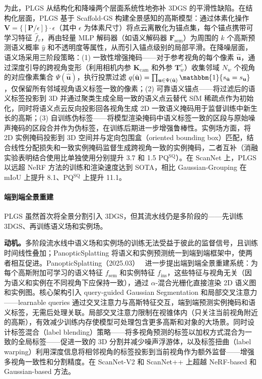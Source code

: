 为此，PLGS 从结构化和降噪两个层面系统性地弥补 3DGS 的平滑性缺陷。在结构化层面，PLGS 基于 Scaffold-GS 构建全景感知的高斯模型：通过体素化操作 $\mathbf{V} = \{[\mathbf{P}/\epsilon]\} \cdot \epsilon$（其中 $\epsilon$ 为体素尺寸）将点云离散化为锚点集，每个锚点携带可学习特征 $\hat{f}_v$，再由轻量 MLP 解码器（如语义解码器 $\mathbf{F}_{\text{sem}}$）为周围的 $k$ 个高斯预测语义概率 $\hat{y}$ 和不透明度等属性，从而引入锚点级别的局部平滑。在降噪层面，语义场采用三阶段策略：(1) 一致性增强掩码——对于参考视角的每个像素 $\hat{\mathbf{u}}$，通过深度引导的跨视角变形（利用相机内参 $\mathbf{K}_{\text{cam}}$ 和外参 $\mathbf{T}_w^c$）收集邻域 $N_w$ 个视角的对应像素集合 $\Psi(\hat{\mathbf{u}})$，执行投票过滤 $q(\hat{\mathbf{u}}) = \prod_{\mathbf{u} \in \Psi(\hat{\mathbf{u}})} \mathbbm{1}\{s_{\hat{\mathbf{u}}} = s_{\mathbf{u}}\}$，仅保留所有邻域视角语义标签一致的像素；(2) 可靠语义锚点——将过滤后的语义标签投影到 3D 并通过聚类生成全局一致的语义点云替代 SfM 稀疏点作为初始化，同时将语义点云反向投影回各视角生成 2D 一致语义掩码用于监督训练中新生长的高斯；(3) 自训练伪标签——将模型渲染掩码中语义标签一致的区段与原始噪声掩码的区段合并作为伪标签，在训练后期进一步增强鲁棒性。实例场方面，将 2D 实例掩码投影到 3D 空间并与定向包围盒（oriented bounding box）匹配，结合线性分配损失和一致实例掩码监督生成跨视角一致的实例掩码，二者互补（消融实验表明结合使用比单独使用分别提升 3.7 和 1.5 PQ$^{\text{SQ}}$）。在 ScanNet 上，PLGS 以远超 NeRF 方法的训练和渲染速度达到 SOTA，相比 Gaussian-Grouping 在 mIoU 上提升 8.1、PQ$^{\text{SQ}}$ 上提升 11.1。

\paragraph{端到端全景重建} PLGS 虽然首次将全景分割引入 3DGS，但其流水线仍是多阶段的——先训练 3DGS、再训练语义场和实例场。

\textbf{动机。}多阶段流水线中语义场和实例场的训练无法受益于彼此的监督信号，且训练时间线性叠加；PanopticSplatting 将语义和实例预测统一到端到端框架中，使两者相互促进。PanopticSplatting（2025.03）~\cite{2503_18073} 进一步提出端到端全景重建系统：为每个高斯附加可学习的语义特征 $f_\text{sem}$ 和实例特征 $f_\text{ins}$，这些特征与视角无关（因为语义和实例在不同视角下应保持一致），通过 $\alpha$-混合光栅化直接渲染 2D 语义图和实例图。核心架构引入 query-guided Gaussian Segmentation 和局部交叉注意力——learnable queries 通过交叉注意力与高斯特征交互，端到端预测实例掩码和语义标签，无需后处理关联。局部交叉注意力限制在视锥体内（只关注当前视角附近的高斯），有效减少训练内存使模型可处理包含更多高斯和对象的大场景。同时设计标签混合（label blending）策略——将多视角预测的标签以加权方式混合为一致的全局标签——促进一致的 3D 分割并减少噪声浮游体，以及标签扭曲（label warping）利用深度信息将相邻视角的标签投影到当前视角作为额外监督——增强多视角一致性和分割精度。在 ScanNet-V2 和 ScanNet++ 上超越 NeRF-based 和 Gaussian-based 方法。

